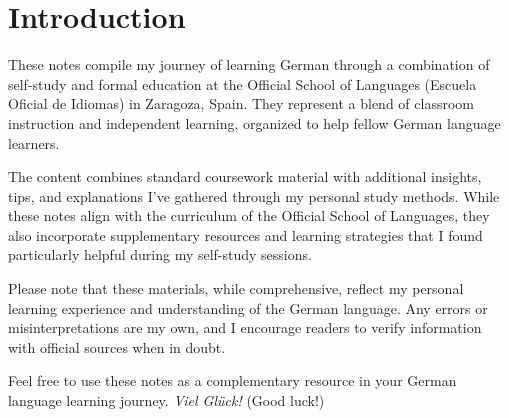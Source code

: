 \section{Introduction}\label{sec:introduction}

These notes compile my journey of learning German through a combination of self-study and formal education at the Official School of Languages (Escuela Oficial de Idiomas) in Zaragoza, Spain. They represent a blend of classroom instruction and independent learning, organized to help fellow German language learners.

The content combines standard coursework material with additional insights, tips, and explanations I've gathered through my personal study methods. While these notes align with the curriculum of the Official School of Languages, they also incorporate supplementary resources and learning strategies that I found particularly helpful during my self-study sessions.

Please note that these materials, while comprehensive, reflect my personal learning experience and understanding of the German language. Any errors or misinterpretations are my own, and I encourage readers to verify information with official sources when in doubt.

Feel free to use these notes as a complementary resource in your German language learning journey. {\em Viel Glück!} (Good luck!)